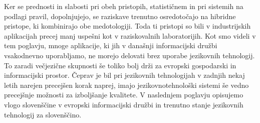 \begin{multicols}{2}
Ker se prednosti in slabosti pri obeh pristopih, statističnem in pri sistemih na podlagi pravil, dopolnjujejo, se raziskave trenutno osredotočajo na hibridne pristope, ki kombinirajo obe medotologiji. Toda ti pristopi so bili v industrijskih aplikacijah precej manj uspešni kot v raziskovalnih laboratorijih.
Kot smo videli v tem poglavju, mnoge aplikacije, ki jih v današnji informacijski družbi vsakodnevno uporab\-ljamo, ne morejo delovati brez uporabe jezikovnih tehnologij. To zaradi večjezične skupnosti še toliko bolj drži za evropski gospodarski in informacij\-ski prostor. Čeprav je bil pri jezikovnih tehnologijah v zadnjih nekaj letih narejen precejšen korak naprej, imajo jezikovnotehnološki sistemi še vedno precejšnje možnosti za izboljšanje kvalitete. V naslednjem poglavju opisujemo vlogo slovenščine v evropski informacijski družbi in trenutno stanje jezikovnih tehnologij za slovenščino.
\end{multicols}

\clearpage



